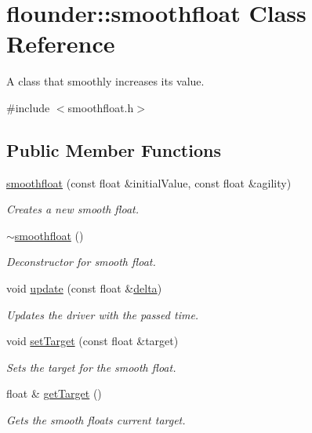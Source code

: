 \hypertarget{classflounder_1_1smoothfloat}{}\section{flounder\+:\+:smoothfloat Class Reference}
\label{classflounder_1_1smoothfloat}


A class that smoothly increases its value.  




{\ttfamily \#include $<$smoothfloat.\+h$>$}

\subsection*{Public Member Functions}
\begin{DoxyCompactItemize}
\item 
\hyperlink{classflounder_1_1smoothfloat_a4a893f989019e779fa377f6ef5576121}{smoothfloat} (const float \&initial\+Value, const float \&agility)
\begin{DoxyCompactList}\small\item\em Creates a new smooth float. \end{DoxyCompactList}\item 
\hyperlink{classflounder_1_1smoothfloat_a4d96e3fdb93fbbf9d28c788a1b7a4e58}{$\sim$smoothfloat} ()
\begin{DoxyCompactList}\small\item\em Deconstructor for smooth float. \end{DoxyCompactList}\item 
void \hyperlink{classflounder_1_1smoothfloat_a38b23a64dda6597576401026725dd535}{update} (const float \&\hyperlink{classflounder_1_1delta}{delta})
\begin{DoxyCompactList}\small\item\em Updates the driver with the passed time. \end{DoxyCompactList}\item 
void \hyperlink{classflounder_1_1smoothfloat_a4e860cb265fb463b281442ee6c8d3b57}{set\+Target} (const float \&target)
\begin{DoxyCompactList}\small\item\em Sets the target for the smooth float. \end{DoxyCompactList}\item 
float \& \hyperlink{classflounder_1_1smoothfloat_a07b3fc6ab9b4eb9de5bf403868880650}{get\+Target} ()
\begin{DoxyCompactList}\small\item\em Gets the smooth floats current target. \end{DoxyCompactList}\item 

\end{DoxyCompactItemize}
